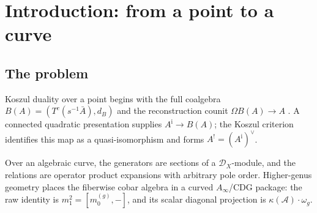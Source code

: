 \documentclass[11pt]{article}
\theoremstyle{plain}
\theoremstyle{definition}
\theoremstyle{remark}
\newcommand{\fg}{\mathfrak{g}}
\newcommand{\cA}{\mathcal{A}}
\newcommand{\cD}{\mathcal{D}}
\newcommand{\barB}{\overline{B}}
\begin{document}
\begin{abstract}
The ordered bar complex
$\barB^{\mathrm{ord}}_X(A_b)$ with its deconcatenation coproduct and
collision kernel $K_{A_b}^{\mathrm{coll}}(z)$ is a common source for
the shadow operators.  Their scalar coordinates use normalized
equivariant functionals.  In arity two,
\(q_2(K_\cA^{\mathrm{coll}})\in
\operatorname{End}_\cA(2)_{h\Sigma_2}\), and
\(\tau_{\cA,2}^{\mathrm{res}}\colon
\operatorname{End}_\cA(2)_{h\Sigma_2}\to\mathbf C\)
recovers $\kappa$ on the abelian and scalar lanes; the non-abelian
Kac--Moody value
\(\kappa=\tau_{\cA,2}^{\mathrm{res}}
q_2(K_\cA^{\mathrm{coll}})+\dim(\fg)/2\)
encodes the Sugawara shift. The locus
$\mathrm{KSDual} \subset \mathrm{Kosz}(X)$ on which the Verdier
involution $\cA \mapsto \cA^!$ acts by the identity is the
$\mathbb{Z}/2$-fixed sublocus in the finite-type curved
Verdier--Koszul ambient. On its admissible Koszul-complete part, a
chosen self-duality map
$\sigma_\cA\colon\cA\xrightarrow{\sim}K_X(\cA)$ represents the fixed
point, and Theorem~H retains its family support set~$S$.  The
Borcherds trace identity \cite{Borcherds1998,Gritsenko1999}
$\kappa_{\mathrm{BKM}}(\Phi_N) = c_N(0)/2$
is the equivariant signature.
The Heisenberg algebra provides the first exact local calculation and
displays the comparison maps required for its global realization.
\end{abstract}

\tableofcontents


\section{Introduction: from a point to a curve}
\label{sec:introduction}

\subsection{The problem}

Koszul duality over a point begins with the full coalgebra
$B(A)=(T^c(s^{-1}\bar A),d_B)$ and the reconstruction counit
$\Omega B(A)\to A$ \cite{Priddy70,BGS96,LV12}.  A connected
quadratic presentation supplies $A^{\mathrm i}\to B(A)$; the Koszul
criterion identifies this map as a quasi-isomorphism and forms
$A^!=(A^{\mathrm i})^\vee$.

Over an algebraic curve, the generators are sections of a
$\cD_X$-module, and the relations are operator product expansions
with arbitrary pole order.  Higher-genus geometry places the
fiberwise cobar algebra in a curved $A_\infty$/CDG package:
the raw identity is $m_1^2=[m_0^{(g)},-]$, and its scalar diagonal
projection is $\kappa(\cA)\cdot\omega_g$.
\end{document}
